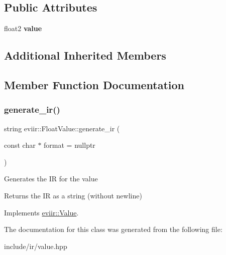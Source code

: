 \subsection*{Public Attributes}
\begin{DoxyCompactItemize}
\item 
\mbox{\label{classeviir_1_1FloatValue_a358648f87126c79adda8949f272fb56d}} 
float2 {\bfseries value}
\end{DoxyCompactItemize}
\subsection*{Additional Inherited Members}


\subsection{Member Function Documentation}
\mbox{\label{classeviir_1_1FloatValue_a8713d6eb43445ba56c4104bce8fe7070}} 
\subsubsection{\texorpdfstring{generate\+\_\+ir()}{generate\_ir()}}
{\footnotesize\ttfamily string eviir\+::\+Float\+Value\+::generate\+\_\+ir (\begin{DoxyParamCaption}\item[{const char $\ast$}]{format = {\ttfamily nullptr} }\end{DoxyParamCaption})\hspace{0.3cm}{\ttfamily [virtual]}}

Generates the IR for the value \begin{DoxyReturn}{Returns}
the IR as a string (without newline) 
\end{DoxyReturn}


Implements \hyperlink{classeviir_1_1Value_a0613bf660425df31e230681555f64dea}{eviir\+::\+Value}.



The documentation for this class was generated from the following file\+:\begin{DoxyCompactItemize}
\item 
include/ir/value.\+hpp\end{DoxyCompactItemize}
